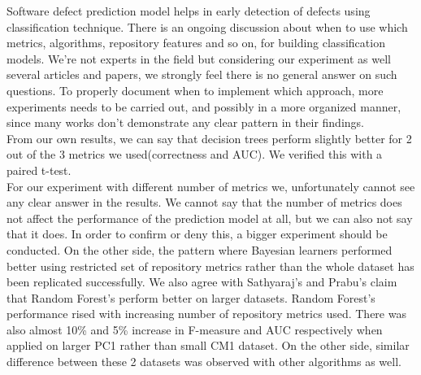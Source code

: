 Software defect prediction model helps in early detection of defects using classification technique. There is an ongoing discussion about when to use which metrics, algorithms, repository features and so on, for building classification models. We're not experts in the field but considering our experiment as well several articles and papers, we strongly feel there is no general answer on such questions. To properly document when to implement which approach, more experiments needs to be carried out, and possibly in a more organized manner, since many works don't demonstrate any clear pattern in their findings.\\
From our own results, we can say that decision trees perform slightly better for 2 out of the 3 metrics we used(correctness and AUC). We verified this with a paired t-test. \\ For our experiment with different number of metrics we, unfortunately cannot see any clear answer in the results. We cannot say that the number of metrics does not affect the performance of the prediction model at all, but we can also not say that it does. In order to confirm or deny this, a bigger experiment should be conducted.  On the other side, the pattern where Bayesian learners performed better using restricted set of repository metrics rather than the whole dataset has been replicated successfully. 
We also agree with Sathyaraj's and Prabu's claim\cite{sathyaraj2015approach} that Random Forest's perform better on larger datasets. Random Forest's performance rised with increasing number of repository metrics used. There was also almost 10\% and 5\% increase in F-measure and AUC respectively when applied on larger PC1 rather than small CM1 dataset. On the other side, similar difference between these 2 datasets was observed with other algorithms as well.